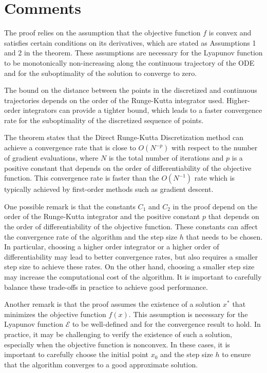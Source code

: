 \section{Comments}
 \begin{itemizedot}
     \item The proof relies on the assumption that the objective function $f$ is convex and satisfies certain conditions on its derivatives, which are stated as Assumptions 1 and 2 in the theorem. These assumptions are necessary for the Lyapunov function to be monotonically non-increasing along the continuous trajectory of the ODE and for the suboptimality of the solution to converge to zero.

     \item The bound on the distance between the points in the discretized and continuous trajectories depends on the order of the Runge-Kutta integrator used. Higher-order integrators can provide a tighter bound, which leads to a faster convergence rate for the suboptimality of the discretized sequence of points.

     \item The theorem states that the Direct Runge-Kutta Discretization method can achieve a convergence rate that is close to $O(N^{-p})$ with respect to the number of gradient evaluations, where $N$ is the total number of iterations and $p$ is a positive constant that depends on the order of differentiability of the objective function. This convergence rate is faster than the $O(N^{-1})$ rate which is typically achieved by first-order methods such as gradient descent.

     \item One possible remark is that the constants $C_1$ and $C_2$ in the proof depend on the order of the Runge-Kutta integrator and the positive constant $p$ that depends on the order of differentiability of the objective function. These constants can affect the convergence rate of the algorithm and the step size $h$ that needs to be chosen. In particular, choosing a higher order integrator or a higher order of differentiability may lead to better convergence rates, but also requires a smaller step size to achieve these rates. On the other hand, choosing a smaller step size may increase the computational cost of the algorithm. It is important to carefully balance these trade-offs in practice to achieve good performance.

     \item Another remark is that the proof assumes the existence of a solution $x^*$ that minimizes the objective function $f(x)$. This assumption is necessary for the Lyapunov function $\mathcal{E}$ to be well-defined and for the convergence result to hold. In practice, it may be challenging to verify the existence of such a solution, especially when the objective function is nonconvex. In these cases, it is important to carefully choose the initial point $x_0$ and the step size $h$ to ensure that the algorithm converges to a good approximate solution.


\end{itemizedot}
